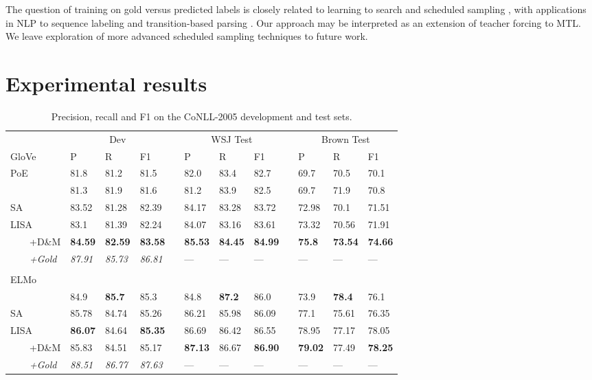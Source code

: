 \documentclass[11pt,a4paper]{article}
\begin{document}
The question of training on gold versus predicted labels is closely related to learning to search \citep{daume2009search,ross2011reduction,chang2015learning} and scheduled sampling \citep{bengio2015scheduled}, with applications in NLP to sequence labeling and transition-based parsing \citep{choi2011getting, goldberg2012dynamic,ballesteros2016training}. Our approach may be interpreted as an extension of teacher forcing \citep{williams1989learning} to MTL. We leave exploration of more advanced scheduled sampling techniques to future work. 


\section{Experimental results}

\begin{table*}[t!]
\begin{tabular}{llllllllllll}
& \multicolumn{3}{c}{Dev} && \multicolumn{3}{c}{WSJ Test} && \multicolumn{3}{c}{Brown Test} \\ \cline{2-4} \cline{6-8} \cline{10-12}
GloVe & P & R & F1 && P & R & F1 && P & R & F1\\ \hline \hline
\citet{he2017deep} PoE & 81.8 &  81.2 & 81.5 & & 82.0 & 83.4 & 82.7 && 69.7 &  70.5 & 70.1 \\ 
\citet{he2018jointly} & 81.3 & 81.9 & 81.6 & & 81.2 & 83.9 & 82.5 && 69.7 & 71.9 & 70.8\\ \hline
SA &  83.52 & 81.28 & 82.39 &&  84.17 &	83.28 &	83.72 && 72.98 & 70.1 & 71.51 \\ 
LISA &  83.1 & 81.39 &  82.24 && 84.07 & 83.16 & 83.61 && 73.32 & 70.56 & 71.91\\ 			
\ \ \ \ +D\&M & {\bf 84.59} & {\bf 82.59} &	{\bf 83.58} && {\bf 85.53} & {\bf 84.45} & {\bf 84.99} && {\bf 75.8} & {\bf 73.54} & {\bf 74.66}\\ 	
\ \ \ \ \emph{+Gold} & \emph{87.91} & \emph{85.73} & \emph{86.81} && --- & --- & --- && --- & --- & --- \\
& & & && & & && & & \\
ELMo & & & && & & && & & \\ \hline \hline
\citet{he2018jointly} & 84.9 & {\bf 85.7} & 85.3 & & 84.8 & {\bf 87.2} & 86.0 && 73.9 & {\bf 78.4} & 76.1\\ \hline
SA &  85.78	& 84.74	& 85.26 &&  86.21 &	85.98 &	86.09 && 77.1 &	75.61 &	76.35 \\ 
LISA &  {\bf 86.07} & 84.64 & {\bf 85.35} && 86.69 & 86.42 & 86.55 && 78.95 & 77.17 &	78.05\\ 			
\ \ \ \ +D\&M &85.83 &	84.51 &	85.17 && {\bf 87.13} & 86.67 & {\bf 86.90} && {\bf 79.02} & 77.49 & {\bf 78.25}\\ 	
\ \ \ \ \emph{+Gold} & \emph{88.51} & \emph{86.77} & \emph{87.63} && --- & --- & --- && --- & --- & ---
\end{tabular}
\caption{Precision, recall and F1 on the CoNLL-2005 development and test sets. \label{tab:conll05-results}}
\end{table*}
\end{document}
